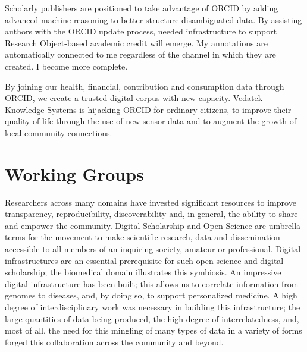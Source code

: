 \documentclass[a4paper,UKenglish]{dagrep}
\begin{document}
Scholarly publishers are positioned to take advantage of ORCID by adding 
advanced machine reasoning to better structure disambiguated data.  By 
assisting authors with the ORCID update process, needed infrastructure to 
support Research Object-based academic credit will emerge.  My annotations are 
automatically connected to me regardless of the channel in which they are 
created.  I become more complete.

By joining our health, financial, contribution and consumption data through 
ORCID, we create a trusted digital corpus with new capacity.  Vedatek Knowledge 
Systems is hijacking ORCID for ordinary citizens, to improve their quality of life 
through the use of new sensor data and to augment the growth of local 
community connections. 




\section{Working Groups }

\license
Researchers across many domains have invested significant resources to improve
transparency, reproducibility, discoverability and, in general, the ability to
share and empower the community.  Digital Scholarship and Open Science are
umbrella terms for the movement to make scientific research, data and
dissemination accessible to all members of an inquiring society, amateur or
professional. Digital infrastructures are an essential prerequisite for such
open science and digital scholarship; the biomedical domain illustrates this
symbiosis. An impressive digital infrastructure has been built; this allows us
to correlate information from genomes to diseases, and, by doing so, to support
personalized medicine. A high degree of interdisciplinary work was necessary in
building this infrastructure; the large quantities of data being produced, the
high degree of interrelatedness, and, most of all, the need for this mingling of
many types of data in a variety of forms forged this collaboration across the
community and beyond.
\end{document}

